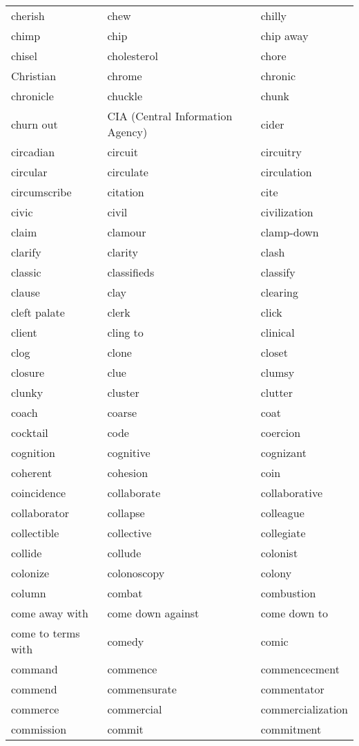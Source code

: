 \documentclass{minimal}
\begin{document}
\begin{longtable}{p{2.7cm}@{\hskip 0.2cm}p{2.7cm}@{\hskip 0.2cm}p{2.7cm}}
cherish & chew & chilly \\
chimp & chip & chip away \\
chisel & cholesterol & chore \\
Christian & chrome & chronic \\
chronicle & chuckle & chunk \\
churn out & CIA (Central Information Agency) & cider \\
circadian & circuit & circuitry \\
circular & circulate & circulation \\
circumscribe & citation & cite \\
civic & civil & civilization \\
claim & clamour & clamp-down \\
clarify & clarity & clash \\
classic & classifieds & classify \\
clause & clay & clearing \\
cleft palate & clerk & click \\
client & cling to & clinical \\
clog & clone & closet \\
closure & clue & clumsy \\
clunky & cluster & clutter \\
coach & coarse & coat \\
cocktail & code & coercion \\
cognition & cognitive & cognizant \\
coherent & cohesion & coin \\
coincidence & collaborate & collaborative \\
collaborator & collapse & colleague \\
collectible & collective & collegiate \\
collide & collude & colonist \\
colonize & colonoscopy & colony \\
column & combat & combustion \\
come away with & come down against & come down to \\
come to terms with & comedy & comic \\
command & commence & commencecment \\
commend & commensurate & commentator \\
commerce & commercial & commercialization \\
commission & commit & commitment \\

\end{longtable}
\end{document}
